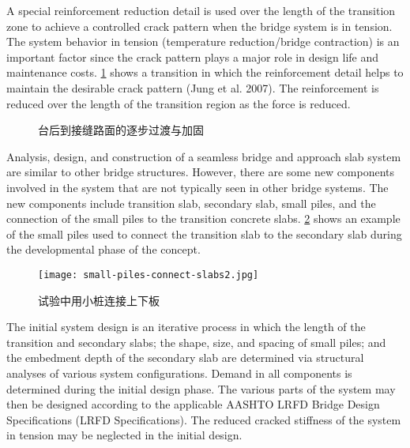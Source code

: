 A special reinforcement reduction detail is used over the length of the transition zone to achieve a controlled crack pattern when the bridge system is in tension. The system behavior in tension (temperature reduction/bridge contraction) is an important factor since the crack pattern plays a major role in design life and maintenance costs. \cref{fig:gradual-transition} shows a transition in which the reinforcement detail helps to maintain the desirable crack pattern (Jung et al. 2007). The reinforcement is reduced over the length of the transition region as the force is reduced.

\begin{figure}
  \caption{台后到接缝路面的逐步过渡与加固}
  \label{fig:gradual-transition}
\end{figure}

Analysis, design, and construction of a seamless bridge and approach slab system are similar to other bridge structures. However, there are some new components involved in the system that are not typically seen in other bridge systems. The new components include transition slab, secondary slab, small piles, and the connection of the small piles to the transition concrete slabs. \cref{fig:small-piles-connect-slabs} shows an example of the small piles used to connect the transition slab to the secondary slab during the developmental phase of the concept.

\begin{figure}
  \texttt{[image: small-piles-connect-slabs2.jpg]}
  \caption{试验中用小桩连接上下板}
  \label{fig:small-piles-connect-slabs}
\end{figure}

The initial system design is an iterative process in which the length of the transition and secondary slabs; the shape, size, and spacing of small piles; and the embedment depth of the secondary slab are determined via structural analyses of various system configurations. Demand in all components is determined during the initial design phase. The various parts of the system may then be designed according to the applicable AASHTO LRFD Bridge Design Specifications (LRFD Specifications). The reduced cracked stiffness of the system in tension may be neglected in the initial design.

